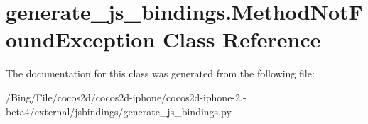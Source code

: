\hypertarget{classgenerate__js__bindings_1_1_method_not_found_exception}{\section{generate\-\_\-js\-\_\-bindings.\-Method\-Not\-Found\-Exception Class Reference}
\label{classgenerate__js__bindings_1_1_method_not_found_exception}
}


The documentation for this class was generated from the following file\-:\begin{DoxyCompactItemize}
\item 
/\-Bing/\-File/cocos2d/cocos2d-\/iphone/cocos2d-\/iphone-\/2.-\/beta4/external/jsbindings/generate\-\_\-js\-\_\-bindings.\-py\end{DoxyCompactItemize}
